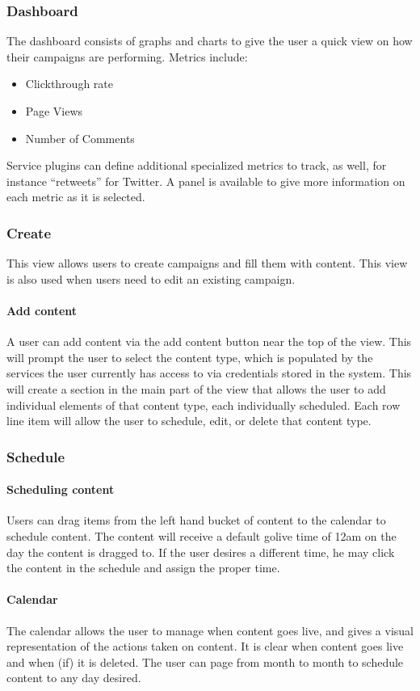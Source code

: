 \documentclass{report}
\begin{document}
        \subsubsection{Dashboard}
        The dashboard consists of graphs and charts to give the user a quick view on how their campaigns are performing.
		Metrics include:
        \begin{itemize}
        \item Clickthrough rate
        \item Page Views
        \item Number of Comments
        \end{itemize}
        Service plugins can define additional specialized metrics to track, as well, for instance ``retweets'' for Twitter.
        A panel is available to give more information on each metric as it is selected.
        \subsubsection{Create}
        This view allows users to create campaigns and fill them with content.  This view is also used when users need to edit an existing campaign.
        \paragraph{Add content}
        A user can add content via the add content button near the top of the view.  This will prompt the user to select the content type, which is populated by the services the user currently has access to via credentials stored in the system. This will create a section in the main part of the view that allows the user to add individual elements of that content type, each individually scheduled.  Each row line item will allow the user to schedule, edit, or delete that content type.
        \subsubsection{Schedule}
        \paragraph{Scheduling content}
        Users can drag items from the left hand bucket of content to the calendar to schedule content.  The content will receive a default golive time of 12am on the day the content is dragged to.  If the user desires a different time, he may click the content in the schedule and assign the proper time.
        \paragraph{Calendar}
        The calendar allows the user to manage when content goes live, and gives a visual representation of the actions taken on content.  It is clear when content goes live and when (if) it is deleted.  The user can page from month to month to schedule content to any day desired.
\end{document}

